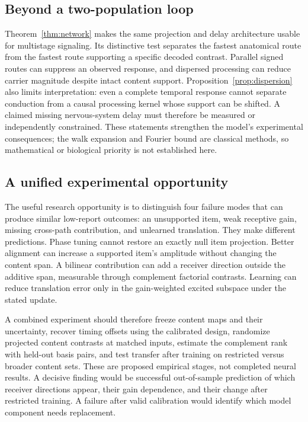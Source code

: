 \documentclass[submission,nolinenumbers]{esj}
\begin{document}
\subsection{Beyond a two-population loop}
Theorem~\ref{thm:network} makes the same projection and delay architecture usable for multistage signaling. Its distinctive test separates the fastest anatomical route from the fastest route supporting a specific decoded contrast. Parallel signed routes can suppress an observed response, and dispersed processing can reduce carrier magnitude despite intact content support. Proposition~\ref{prop:dispersion} also limits interpretation: even a complete temporal response cannot separate conduction from a causal processing kernel whose support can be shifted. A claimed missing nervous-system delay must therefore be measured or independently constrained. These statements strengthen the model's experimental consequences; the walk expansion and Fourier bound are classical methods, so mathematical or biological priority is not established here.

\subsection{A unified experimental opportunity}
The useful research opportunity is to distinguish four failure modes that can produce similar low-report outcomes: an unsupported item, weak receptive gain, missing cross-path contribution, and unlearned translation. They make different predictions. Phase tuning cannot restore an exactly null item projection. Better alignment can increase a supported item's amplitude without changing the content span. A bilinear contribution can add a receiver direction outside the additive span, measurable through complement factorial contrasts. Learning can reduce translation error only in the gain-weighted excited subspace under the stated update.

A combined experiment should therefore freeze content maps and their uncertainty, recover timing offsets using the calibrated design, randomize projected content contrasts at matched inputs, estimate the complement rank with held-out basis pairs, and test transfer after training on restricted versus broader content sets. These are proposed empirical stages, not completed neural results. A decisive finding would be successful out-of-sample prediction of which receiver directions appear, their gain dependence, and their change after restricted training. A failure after valid calibration would identify which model component needs replacement.
\end{document}
